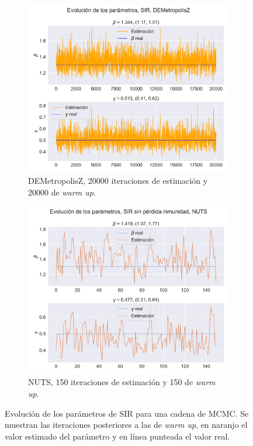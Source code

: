 \begin{figure}[h]
    \centering
    \begin{subfigure}[b]{0.49\linewidth}
        \centering \includegraphics[height=0.65\linewidth]{img/content/chapter4/DEMetropolis_sir_params_trace.pdf}
        \caption{DEMetropolisZ, 20000 iteraciones de estimación y 20000 de \textit{warm up}.}
        \label{fig:DEMetropolis_sirs_params_trace}
    \end{subfigure}
    \begin{subfigure}[b]{0.49\linewidth}
        \centering \includegraphics[height=0.65\linewidth]{img/content/chapter4/NUTS_sir_params_trace.pdf}
        \caption{NUTS, 150 iteraciones de estimación y 150 de \textit{warm up}.}
        \label{fig:NUTS_sir_params_trace}
    \end{subfigure}
    \caption{Evolución de los parámetros de SIR para una cadena de MCMC. Se muestran las iteraciones posteriores a las de \textit{warm up}, en naranjo el valor estimado del parámetro y en línea punteada el valor real.}
    \label{fig:MCMC_sir_params_trace}
\end{figure}

